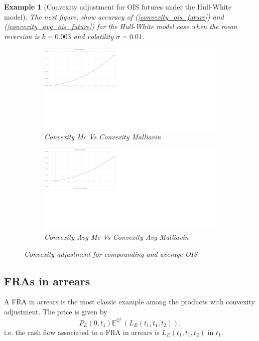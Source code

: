 \documentclass[a4paper,10pt]{article}
\newtheorem{example}[theorem]{Example}
\newcommand{\1}{\mathbf{1}}
\begin{document}
\begin{example}[Convexity adjustment for OIS futures under the Hull-White model]
The next figure, show accuracy of (\ref{convexity_ois_future}) and (\ref{convexity_avg_ois_future}) for the Hull-White model case when the mean reversion is $k=0.003$ and volatility $\sigma=0.01$. 
\begin{figure}[H]
\begin{subfigure}{.5\textwidth}
  \centering
  \includegraphics[scale=0.2]{Figures/convexity_ois.jpg}
		\caption{Convexity Mc Vs Convexity Malliavin}
\end{subfigure}
\begin{subfigure}{.5\textwidth}
  \centering
  \includegraphics[scale=0.2]{Figures/convexity_avg_ois.jpg}
		\caption{Convexity Avg Mc Vs Convexity Avg Malliavin}
\end{subfigure}
\caption{Convexity adjustment for compounding and average OIS}
\end{figure} 
\end{example}



\subsection{FRAs in arrears}
A FRA in arrears is the most classic example among the products with convexity adjustment. The price is given by 
\begin{equation}\label{FRAinArrear}
P_{E}(0,t_1)\mathbb{E}^{\mathbb{Q}^{t_1}}\left(L_{E}(t_1,t_1,t_2)\right),
\end{equation}
i.e. the cash flow associated to a FRA in arrears is $L_{E}(t_1,t_1,t_2)$ in $t_1$.
\end{document}
